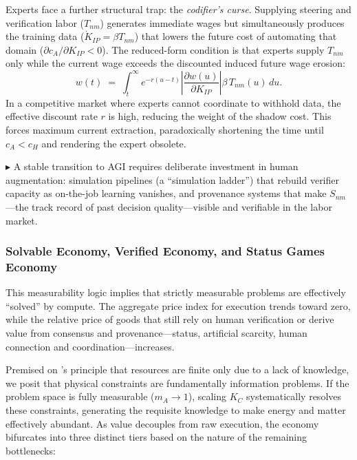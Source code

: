 \documentclass[12pt, letter]{article}
\begin{document}
Experts face a further structural trap: the \emph{codifier's curse}. Supplying steering and verification labor ($T_{nm}$) generates immediate wages but simultaneously produces the training data ($\dot{K}_{IP} = \beta T_{nm}$) that lowers the future cost of automating that domain ($\partial c_A / \partial K_{IP} < 0$). The reduced-form condition is that experts supply $T_{nm}$ only while the current wage exceeds the discounted induced future wage erosion:
\begin{equation}
w(t) \;=\; \int_t^\infty e^{-r(u-t)}\left|\frac{\partial w(u)}{\partial K_{IP}}\right|\beta\,T_{nm}(u)\,du.
\end{equation}
In a competitive market where experts cannot coordinate to withhold data, the effective discount rate $r$ is high, reducing the weight of the shadow cost. This forces maximum current extraction, paradoxically shortening the time until $c_A < c_H$ and rendering the expert obsolete.

$\blacktriangleright$ A stable transition to AGI requires deliberate investment in human augmentation: simulation pipelines (a ``simulation ladder'') that rebuild verifier capacity as on-the-job learning vanishes, and provenance systems that make $S_{nm}$---the track record of past decision quality---visible and verifiable in the labor market.


\subsubsection{Solvable Economy, Verified Economy, and Status Games Economy}
This measurability logic implies that strictly measurable problems are effectively ``solved'' by compute. The aggregate price index for execution trends toward zero, while the relative price of goods that still rely on human verification or derive value from consensus and provenance---status, artificial scarcity, human connection and coordination---increases.

Premised on \cite{Deutsch2011}'s principle that resources are finite only due to a lack of knowledge, we posit that physical constraints are fundamentally information problems. If the problem space is fully measurable ($m_A \to 1$), scaling $K_C$ systematically resolves these constraints, generating the requisite knowledge to make energy and matter effectively abundant. As value decouples from raw execution, the economy bifurcates into three distinct tiers based on the nature of the remaining bottlenecks:
\end{document}
